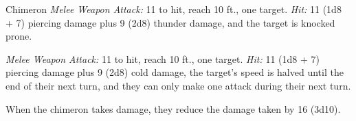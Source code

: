\documentclass[10pt,a4paper,twoside,bg=print,twocolumn,openany,nodeprecatedcode]{dndbook}
\begin{document}
\begin{DndMonster}[float=t]{Chimeron}
\textsl{Melee Weapon Attack:} 11 to hit, reach 10 ft., one target. \textsl{Hit:} 11 (1d8 + 7) piercing damage plus 9 (2d8) thunder damage, and the target is knocked prone.

\textsl{Melee Weapon Attack:} 11 to hit, reach 10 ft., one target. \textsl{Hit:} 11 (1d8 + 7) piercing damage plus 9 (2d8) cold damage, the target's speed is halved until the end of their next turn, and they can only make one attack during their next turn.

When the chimeron takes damage, they reduce the damage taken by 16 (3d10).

\end{DndMonster}
\end{document}
